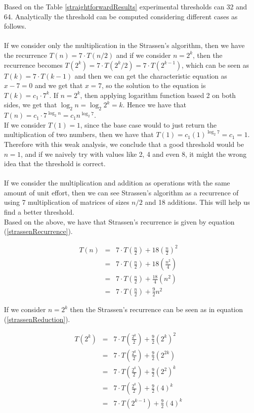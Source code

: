 \documentclass[tikz, 12pt]{scrartcl}
\begin{document}
Based on the Table \ref{straightforwardResults} experimental thresholds can 32 and 64. Analytically the threshold can be computed considering different cases as follows.\\
\\
If we consider only the multiplication in the Strassen's algorithm, then we have the recurrence $T(n) = 7 \cdot T(n / 2)$ and if we consider $n = 2^k$, then the recurrence becomes $T(2^k) = 7 \cdot T(2^k/2) = 7 \cdot T(2^{k - 1})$, which can be seen as $T(k) = 7 \cdot T(k - 1)$ and then we can get the characteristic equation as $x - 7 = 0$ and we get that $x = 7$, so the solution to the equation is $T(k) = c_1 \cdot 7^k$.   If $n = 2^k$, then applying logarithm function based 2 on both sides, we get that $\log_2 n = \log_2 2^k = k$. Hence we have that $T(n) = c_1 \cdot 7^{\log_2 n} = c_1 n^{\log_2 7}$.\\
If we consider $T(1) = 1$, since the base case would to just return the multiplication of two numbers, then we have that $T(1) = c_1(1)^{\log_2 7} = c_1 = 1$. Therefore with this weak analysis, we conclude that a good threshold would be $n = 1$, and if we naively try with values like 2, 4 and even 8, it might the wrong idea that the threshold is correct.\\
\\
If we consider the multiplication and addition as operations with the same amount of unit effort, then we can see Strassen's algorithm as a recurrence of using 7 multiplication of matrices of sizes $n/2$ and 18 additions. This will help us find a better threshold.\\
Based on the above, we have that Strassen's recurrence is given by equation (\ref{strassenRecurrence}). 

\begin{eqnarray}
T(n) 	&	=  	&	7 \cdot T\left(\frac{n}{2}\right) + 18\left(\frac{n}{2}\right)^2 \nonumber \\
	&	=	&	7 \cdot T\left(\frac{n}{2}\right) + 18\left(\frac{n^2}{4}\right) \nonumber \\
	&	=	&	7 \cdot T\left(\frac{n}{2}\right) + \frac{18}{4}\left(n^2 \right) \nonumber \\
	&	=	&	7 \cdot T\left(\frac{n}{2}\right) + \frac{9}{2}n^2  \label{strassenRecurrence}
\end{eqnarray}

If we consider $n = 2^k$ then the Strassen's recurrence can be seen as in equation (\ref{strassenReduction}).

\begin{eqnarray}
T(2^k)	&	=	&	7 \cdot T\left(\frac{2^k}{2}\right) + \frac{9}{2}\left(2^k \right)^2 \nonumber \\
		&	=	&	7 \cdot T\left(\frac{2^k}{2}\right) + \frac{9}{2}\left(2^{2k} \right) \nonumber \\
		&	=	&	7 \cdot T\left(\frac{2^k}{2}\right) + \frac{9}{2}\left(2^{2} \right)^k \nonumber \\
		&	=	&	7 \cdot T\left(\frac{2^k}{2}\right) + \frac{9}{2}\left(4 \right)^k \nonumber \\
		&	=	&	7 \cdot T\left(2^{k-1}\right) + \frac{9}{2}\left(4 \right)^k \label{strassenReduction}
\end{eqnarray}
\end{document}
